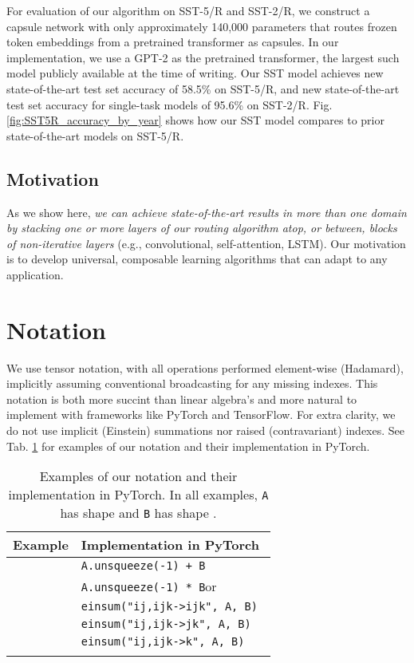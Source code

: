 \documentclass[11pt,a4paper]{article}
\begin{document}
For evaluation of our algorithm on SST-5/R and SST-2/R, we construct a capsule network with only approximately 140,000 parameters that routes frozen token embeddings from a pretrained transformer \cite{DBLP:journals/corr/VaswaniSPUJGKP17} as capsules. In our implementation, we use a GPT-2 \cite{GPT-2-Radford-et-al} as the pretrained transformer, the largest such model publicly available at the time of writing. Our SST model achieves new state-of-the-art test set accuracy of 58.5\% on SST-5/R, and new state-of-the-art test set accuracy for single-task models of 95.6\% on SST-2/R. Fig. \ref{fig:SST5R_accuracy_by_year} shows how our SST model compares to prior state-of-the-art models on SST-5/R.

\subsection*{Motivation}

As we show here, {\em we can achieve state-of-the-art results in more than one domain by stacking one or more layers of our routing algorithm atop, or between, blocks of non-iterative layers} (e.g., convolutional, self-attention, LSTM). Our motivation is to develop universal, composable learning algorithms that can adapt to any application.

\section{Notation}\label{sec:notation}

We use tensor notation, with all operations performed element-wise (Hadamard), implicitly assuming conventional broadcasting for any missing indexes. This notation is both more succint than linear algebra's and more natural to implement with frameworks like PyTorch and TensorFlow. For extra clarity, we do not use implicit (Einstein) summations nor raised (contravariant) indexes. See Tab. \ref{tab:notation_examples} for examples of our notation and their implementation in PyTorch.

\begin{table}[h]
	\small
	\begin{center}
		\begin{tabular}{@{}ll@{}}
			\toprule
			\bf Example & \bf Implementation in PyTorch \\
			\midrule
			\addlinespace[0.6em]
			 & {\tt A.unsqueeze(-1) + B} \\
			\addlinespace[0.6em]
			 & {\tt A.unsqueeze(-1) * B}\quad or \\
			 & {\tt einsum("ij,ijk->ijk", A, B) } \\
			\addlinespace[0.6em]
			 & {\tt einsum("ij,ijk->jk", A, B)} \\
			\addlinespace[0.6em]
			 & {\tt einsum("ij,ijk->k",\,A,\,B)} \\
			\addlinespace[0.6em]
			\bottomrule
		\end{tabular}
	\end{center}
	\caption{\label{tab:notation_examples}Examples of our notation and their implementation in PyTorch. In all examples, {\tt A} has shape  and {\tt B} has shape .}
\end{table}
\end{document}
